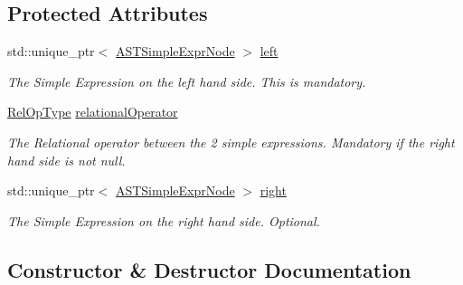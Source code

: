 \subsection*{Protected Attributes}
\begin{DoxyCompactItemize}
\item 
\mbox{\label{classparser_1_1ast_1_1ASTExprNode_aa7250732754b829ca100d4ce35a021b0}} 
std\+::unique\+\_\+ptr$<$ \hyperlink{classparser_1_1ast_1_1ASTSimpleExprNode}{A\+S\+T\+Simple\+Expr\+Node} $>$ \hyperlink{classparser_1_1ast_1_1ASTExprNode_aa7250732754b829ca100d4ce35a021b0}{left}
\begin{DoxyCompactList}\small\item\em The Simple Expression on the left hand side. This is mandatory. \end{DoxyCompactList}\item 
\mbox{\label{classparser_1_1ast_1_1ASTExprNode_a45fa00b5859baeb11b6976b145b5966e}} 
\hyperlink{ASTExprNode_8h_ade5793e91a548ec55c1a8e776984297a}{Rel\+Op\+Type} \hyperlink{classparser_1_1ast_1_1ASTExprNode_a45fa00b5859baeb11b6976b145b5966e}{relational\+Operator}
\begin{DoxyCompactList}\small\item\em The Relational operator between the 2 simple expressions. Mandatory if the right hand side is not null. \end{DoxyCompactList}\item 
\mbox{\label{classparser_1_1ast_1_1ASTExprNode_a26f40099c4e3848ba0ed00388d507d72}} 
std\+::unique\+\_\+ptr$<$ \hyperlink{classparser_1_1ast_1_1ASTSimpleExprNode}{A\+S\+T\+Simple\+Expr\+Node} $>$ \hyperlink{classparser_1_1ast_1_1ASTExprNode_a26f40099c4e3848ba0ed00388d507d72}{right}
\begin{DoxyCompactList}\small\item\em The Simple Expression on the right hand side. Optional. \end{DoxyCompactList}\end{DoxyCompactItemize}


\subsection{Constructor \& Destructor Documentation}
\mbox{\label{classparser_1_1ast_1_1ASTExprNode_a591850e9f50fcbb6f8d97f3a40a3a2ba}} 
